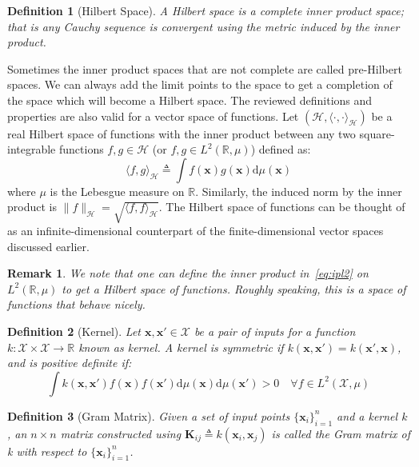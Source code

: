 \documentclass[conference]{IEEEtran}
\newtheorem{remark}{Remark}
\newtheorem{definition}{Definition}
\newcommand{\Hcal}{\mathcal{H}}
\newcommand{\Xcal}{\mathcal{X}}
\begin{document}
\begin{definition}[Hilbert Space]
A Hilbert space is a complete inner product space; that is any Cauchy sequence is convergent using the metric induced by the inner product.
\end{definition}

Sometimes the inner product spaces that are not complete are called pre-Hilbert spaces. We can always add the limit points to the space to get a completion of the space which will become a Hilbert space. The reviewed definitions and properties are also valid for a vector space of functions. Let $(\Hcal, \langle\cdot,\cdot\rangle_{\Hcal})$ be a real Hilbert space of functions with the inner product between any two square-integrable functions $f, g \in \Hcal$ (or \mbox{$f, g \in L^2(\mathbb{R}, \mu)$}) defined as:
\begin{equation}
\label{eq:ipl2}
	\langle f, g\rangle_{\Hcal} \triangleq \int f(\mathbf{x}) g(\mathbf{x}) \mathrm{d}\mu(\mathbf{x})
\end{equation}
where $\mu$ is the Lebesgue measure on $\mathbb{R}$. Similarly, the induced norm by the inner product is \mbox{$\lVert f \rVert_{\Hcal} = \sqrt{\langle f, f\rangle_{\Hcal}}$}. The Hilbert space of functions can be thought of as an infinite-dimensional counterpart of the finite-dimensional vector spaces discussed earlier.

\begin{remark}
We note that one can define the inner product in~\eqref{eq:ipl2} on $L^2(\mathbb{R}, \mu)$ to get a Hilbert space of functions. Roughly speaking, this is a space of functions that behave nicely.
\end{remark}

\begin{definition}[Kernel]
Let $\mathbf{x}, \mathbf{x}' \in \mathcal{X}$ be a pair of inputs for a function \mbox{$k:\mathcal{X} \times \mathcal{X} \to \mathbb{R}$} known as kernel. A kernel is symmetric if $k(\mathbf{x}, \mathbf{x}')=k(\mathbf{x}',\mathbf{x})$, and is positive definite if:
\begin{equation}
	\nonumber \int k(\mathbf{x}, \mathbf{x}') f(\mathbf{x}) f(\mathbf{x}') \mathrm{d}\mu(\mathbf{x}) \mathrm{d}\mu(\mathbf{x}') > 0 \quad \forall f \in L^2(\Xcal,\mu)
\end{equation}
\end{definition}

\begin{definition}[Gram Matrix]
Given a set of input points $\{\mathbf{x}_i\}_{i=1}^{n}$ and a kernel $k$, an $n\times n$ matrix constructed using $\mathbf{K}_{ij} \triangleq k(\mathbf{x}_i, \mathbf{x}_j)$ is called the Gram matrix of k with respect to $\{\mathbf{x}_i\}_{i=1}^{n}$.
\end{definition}
\end{document}
